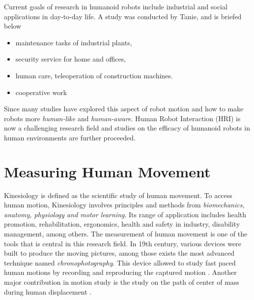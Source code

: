  

Current goals of research in humanoid robots include industrial and social applications in day-to-day life. 
A study was conducted by Tanie, \cite{tanie} and is briefed below

\begin{itemize}
\item maintenance tasks of industrial plants,
\item security service for home and offices,
\item human care, teleoperation of construction machines.
\item cooperative work
\end{itemize}

Since many studies have explored this aspect of robot motion and how to make robots more \textit{human-like} and 
\textit{human-aware}. Human Robot Interaction (HRI) is now a challenging research field and studies on the efficacy 
of humanoid robots in human environments are further proceeded.

\section{Measuring Human Movement}

Kinesiology is defined as the scientific study of human movement. To access human motion, Kinesiology involves principles
and methods from \textit{biomechanics, anatomy, physiology and motor learning}. Its range of application includes health
promotion, rehabilitation, ergonomics, health and safety in industry, disability management, among others. The 
measurement of human movement is one of the tools that is central in this research field. In 19th century, various 
devices were built to produce the moving pictures, among those exists the most advanced technique named 
\textit{chronophotography}. This device allowed to study fast paced human motions by recording and reproducing the 
captured motion \cite{RosenhahnBodo2008HMUM}. Another major contribution in motion study is the study on the path of 
center of mass during human displacement \cite{alma991010593879705596}.

 

